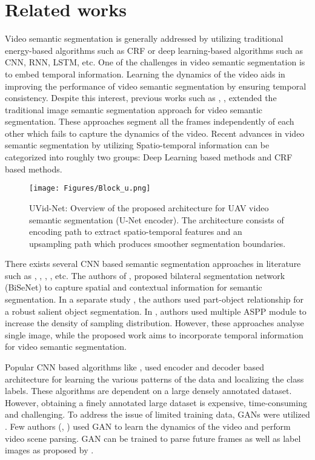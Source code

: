 \documentclass[journal]{IEEEtran}
\begin{document}
\section{Related works}
\label{sec:literature}
Video semantic segmentation is generally addressed by utilizing traditional energy-based algorithms such as CRF or deep learning-based algorithms such as CNN, RNN, LSTM, etc. One of the challenges in video semantic segmentation is to embed temporal information. Learning the dynamics of the video aids in improving the performance of video semantic segmentation by ensuring temporal consistency. Despite this interest, previous works such as \cite{19}, \cite{semantic}, \cite{1} extended the traditional image semantic segmentation approach for video semantic segmentation. These approaches segment all the frames independently of each other which fails to capture the dynamics of the video. Recent advances in video semantic segmentation by utilizing Spatio-temporal information can be categorized into roughly two groups: Deep Learning based methods and CRF based methods.
\begin{figure*}[h]
	\begin{center}
		\texttt{[image: Figures/Block\_u.png]}
	\end{center}
	\caption{UVid-Net: Overview of the proposed architecture for UAV video semantic segmentation (U-Net encoder). The architecture consists of encoding path to extract spatio-temporal features and an upsampling path which produces smoother segmentation boundaries.}
	\label{fig:unet}
\end{figure*}



There exists several CNN based semantic segmentation approaches in literature such as \cite{26}, \cite{24}, \cite{22}, \cite{23},  \cite{29} etc. The authors of \cite{26}, proposed bilateral segmentation network (BiSeNet) to capture spatial and contextual information for semantic segmentation. In a separate study \cite{liu2021part}, the authors used part-object relationship for a robust salient object segmentation.  In \cite{lian2021cascaded}, authors used multiple ASPP module to increase the density of sampling distribution. However, these approaches analyse single image, while the proposed work aims to incorporate temporal information for video semantic segmentation.



Popular CNN based algorithms like \cite{2}, \cite{4} used encoder and decoder based architecture for learning the various patterns of the data and localizing the class labels. These algorithms are dependent on a large densely annotated dataset. However, obtaining a finely annotated large dataset is expensive, time-consuming and challenging. To address the issue of limited training data, GANs were utilized \cite{24}. Few authors (\cite{28}, \cite{15}) used GAN to learn the dynamics of the video and perform video scene parsing. GAN can be trained to parse future frames as well as label images as proposed by \cite{15}.
\end{document}
